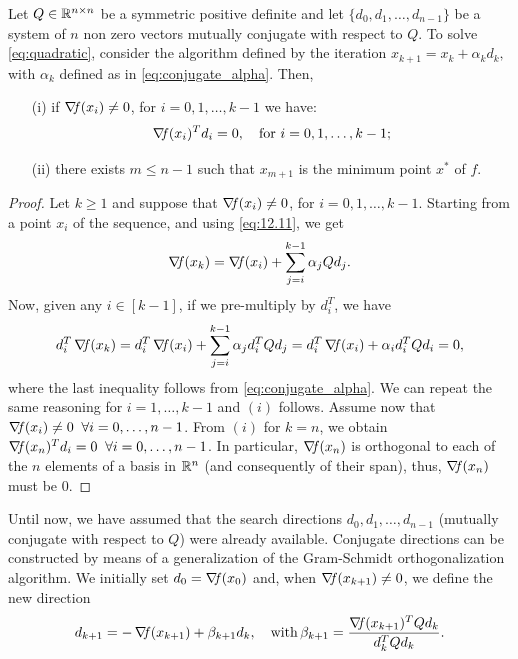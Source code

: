 \documentclass[10pt,a4paper]{article}
\begin{document}
\begin{proposition}\label{prop:cg}
	Let $Q\in \mathbb{R}^{n\times n}$ be a symmetric positive definite and let $\{d_0, d_1, \ldots, d_{n-1}\}$ be a system of $n$ non zero vectors mutually conjugate with respect to $Q$. To solve \eqref{eq:quadratic}, consider the algorithm defined by the iteration $x_{k+1} = x_k + \alpha_k d_k,$
with $\alpha_k$ defined as in \eqref{eq:conjugate_alpha}. Then, 
\begin{itemize}
\item[(i)] if $\operatorname*{\mathit{\nabla \!f}}(x_i) \neq 0$, for $i = 0, 1, \ldots, k - 1$ we have:
\begin{equation*}
\operatorname*{\mathit{\nabla \!f}}(x_i)^T d_i = 0, \quad \text{for } i = 0, 1, \ldots, k - 1;
\end{equation*}
\item[(ii)] there exists $m \leq n - 1$ such that $x_{m+1}$ is the minimum point $x^*$ of $f$.
\end{itemize}
\end{proposition}
\begin{proof}
	Let $k \geq 1$ and suppose that $\operatorname*{\mathit{\nabla \!f}}(x_i) \neq 0$, for $i = 0, 1, \ldots, k - 1$. Starting from a point $x_i$ of the sequence, and using \eqref{eq:12.11}, we get
\begin{equation*}
	\operatorname*{\mathit{\nabla \!f}}(x_k) = \operatorname*{\mathit{\nabla \!f}}(x_i) + \sum_{j=i}^{k-1} \alpha_j Q d_j.
\end{equation*}
Now, given any $i\in[k-1]$, if we pre-multiply by $d_i^T$, we have 
$$d_i^T \operatorname*{\mathit{\nabla \!f}}(x_k) = d_i^T\operatorname*{\mathit{\nabla \!f}}(x_i)+ \sum_{j=i}^{k-1} \alpha_j d_i^TQ d_j  = d_i^T\operatorname*{\mathit{\nabla \!f}}(x_i)+ \alpha_i d_i^TQ d_i = 0,$$
where the last inequality follows from \eqref{eq:conjugate_alpha}. We can repeat the same reasoning for $i=1, \dots, k-1$ and $(i)$ follows. Assume now that $\operatorname*{\mathit{\nabla \!f}}(x_i)\neq 0 \;\; \forall i=0, \dots, n-1$. From $(i)$ for $k=n$, we obtain $\operatorname*{\mathit{\nabla \!f}}(x_n)^Td_i=0 \;\; \forall i=0, \dots, n-1$. In particular, $\operatorname*{\mathit{\nabla \!f}}(x_n)$ is orthogonal to each of the $n$ elements of a basis in $\mathbb{R}^n$ (and consequently of their span), thus, $\operatorname*{\mathit{\nabla \!f}}(x_n)$ must be 0. 
\end{proof} 
Until now, we have assumed that the search directions $d_0 , d_1 , \dots , d_{n-1}$ (mutually conjugate with respect to $Q$) were already available. Conjugate directions can be constructed by means of a generalization of the Gram-Schmidt orthogonalization algorithm. We initially set $d_0 = \operatorname*{\mathit{\nabla \!f}}(x_0)$ and, when $\operatorname*{\mathit{\nabla \!f}}(x_{k+1})\neq 0$, we define the new direction 
\begin{equation}\label{eq:cg}
	d_{k+1} = -\operatorname*{\mathit{\nabla \!f}}(x_{k+1}) +\beta_{k+1} d_k, \quad \mathord{\mathrm{with }}\, \beta_{k+1} =\frac{\operatorname*{\mathit{\nabla \!f}}(x_{k+1})^TQd_k}{d_k^TQd_k}.
\end{equation}
\end{document}
